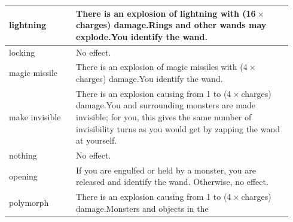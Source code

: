 \begin{longtable}{|>{\RaggedRight}p{0.22451\linewidth}|>{\RaggedRight}p{0.71835\linewidth}|}
\hspace*{0pt}\ignorespaces{}\hspace*{0pt}lightning&\hspace*{0pt}\ignorespaces{}\hspace*{0pt}There is an explosion of lightning with (16{\mbox{$~$}}{\mbox{$\times$}}{\mbox{$~$}}charges) damage.\newline{}Rings and other wands may explode.\newline{}You identify the wand.\\ \hline \hspace*{0pt}\ignorespaces{}\hspace*{0pt}locking&\hspace*{0pt}\ignorespaces{}\hspace*{0pt}No effect.\\ \hline \hspace*{0pt}\ignorespaces{}\hspace*{0pt}magic missile&\hspace*{0pt}\ignorespaces{}\hspace*{0pt}There is an explosion of magic missiles with (4{\mbox{$~$}}{\mbox{$\times$}}{\mbox{$~$}}charges) damage.\newline{}You identify the wand.\\ \hline \hspace*{0pt}\ignorespaces{}\hspace*{0pt}make invisible&\hspace*{0pt}\ignorespaces{}\hspace*{0pt}There is an explosion causing from 1 to (4{\mbox{$~$}}{\mbox{$\times$}}{\mbox{$~$}}charges) damage.\newline{}You and surrounding monsters are made invisible; for you, this gives the same number of invisibility turns as you would get by zapping the wand at yourself.\\ \hline \hspace*{0pt}\ignorespaces{}\hspace*{0pt}nothing&\hspace*{0pt}\ignorespaces{}\hspace*{0pt}No effect.\\ \hline \hspace*{0pt}\ignorespaces{}\hspace*{0pt}opening&\hspace*{0pt}\ignorespaces{}\hspace*{0pt}If you are engulfed or held by a monster, you are released and identify the wand. Otherwise, no effect.\\ \hline \hspace*{0pt}\ignorespaces{}\hspace*{0pt}polymorph&\hspace*{0pt}\ignorespaces{}\hspace*{0pt}There is an explosion causing from 1 to (4{\mbox{$~$}}{\mbox{$\times$}}{\mbox{$~$}}charges) damage.\newline{}Monsters and objects in the 
\end{longtable}
